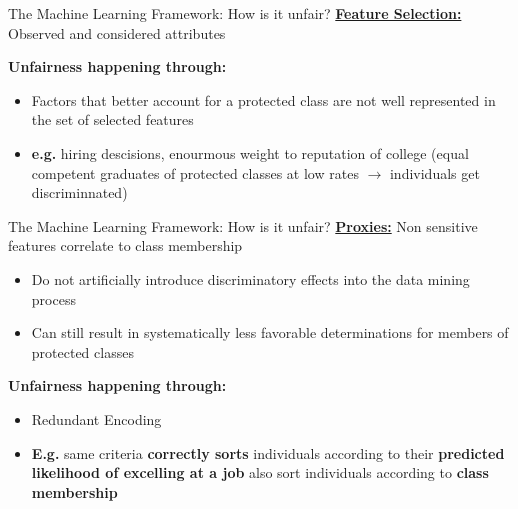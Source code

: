 \begin{frame}{The Machine Learning Framework: How is it unfair? \cite{Barocas.2016, barocas-hardt-narayanan}}
    \underline{\textbf{Feature Selection:}} Observed and considered attributes \newline 
    
    \begin{block}{\textbf{Unfairness happening through:}}
    \begin{itemize}
        \item Factors that better account for a protected class are not well represented in the set of selected features 
        \item \textbf{e.g.} hiring descisions, enourmous weight to reputation of college (equal competent graduates of protected classes at low rates $\rightarrow$ individuals get discriminnated)
    \end{itemize}
        \end{block}
\end{frame}

\begin{frame}{The Machine Learning Framework: How is it unfair? \cite{Barocas.2016, barocas-hardt-narayanan}}
    \underline{\textbf{Proxies:}} Non sensitive features correlate to class membership
    \begin{itemize}
        \item Do not artificially introduce discriminatory effects into the data mining process
        \item Can still result in systematically less favorable determinations for members of protected classes
    \end{itemize} 

    \begin{block}{\textbf{Unfairness happening through:}}
    \begin{itemize}
        \item  Redundant Encoding
        \item \textbf{E.g.} same criteria \textbf{correctly sorts} individuals according to their \textbf{predicted likelihood of excelling at a job} also sort individuals according to \textbf{class membership}
    \end{itemize}
        \end{block}
\end{frame}

